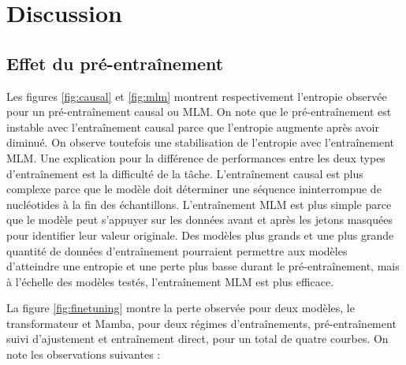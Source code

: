 \chapter{Discussion}
\label{chapitre:4}

\section{Effet du pré-entraînement}
Les figures \ref{fig:causal} et \ref{fig:mlm} montrent respectivement l'entropie observée pour un
pré-entraînement causal ou MLM. On note que le pré-entraînement est instable avec l'entraînement
causal parce que l'entropie augmente après avoir diminué. On observe toutefois une stabilisation de
l'entropie avec l'entraînement MLM. Une explication pour la différence de performances entre les
deux types d'entraînement est la difficulté de la tâche. L'entraînement causal est plus complexe
parce que le modèle doit déterminer une séquence ininterrompue de nucléotides à la fin des
échantillons. L'entraînement MLM est plus simple parce que le modèle peut s'appuyer sur les données
avant et après les jetons masquées pour identifier leur valeur originale. Des modèles plus grands et
une plus grande quantité de données d'entraînement pourraient permettre aux modèles d'atteindre une
entropie et une perte plus basse durant le pré-entraînement, mais à l'échelle des modèles testés,
l'entraînement MLM est plus efficace.

La figure \ref{fig:finetuning} montre la perte observée pour deux modèles, le transformateur et
Mamba, pour deux régimes d'entraînements, pré-entraînement suivi d'ajustement et entraînement
direct, pour un total de quatre courbes. On note les observations suivantes :

